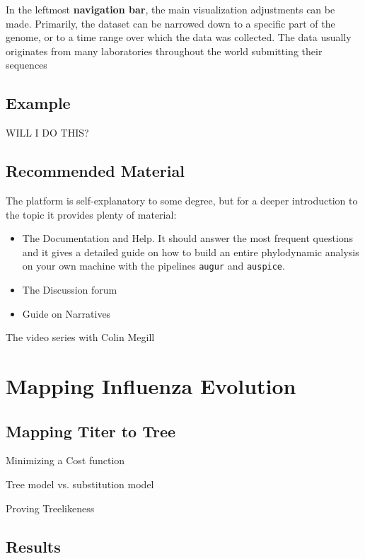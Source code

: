 \documentclass[12pt]{scrartcl}
\begin{document}
  In the leftmost \textbf{navigation bar}, the main visualization adjustments can be made. Primarily, the dataset can be narrowed down to a specific part of the genome, or to a time range over which the data was collected. The data usually originates from many laboratories throughout the world submitting their sequences





  \subsection{Example}

  WILL I DO THIS?

  \subsection{Recommended Material}

    The platform is self-explanatory to some degree, but for a deeper introduction to the topic it provides plenty of material:
\begin{itemize}
  \item The Documentation and Help. It should answer the most frequent questions and it gives a detailed guide on how to build an entire phylodynamic analysis on your own machine with the pipelines \verb|augur| and \verb|auspice|.
  \item The Discussion forum

  \item Guide on Narratives
\end{itemize}

  The video series with Colin Megill

\section{Mapping Influenza Evolution} \label{prediction}

  \subsection{Mapping Titer to Tree}

    Minimizing a Cost function

    Tree model vs. substitution model

    Proving Treelikeness

  \subsection{Results}
\end{document}
